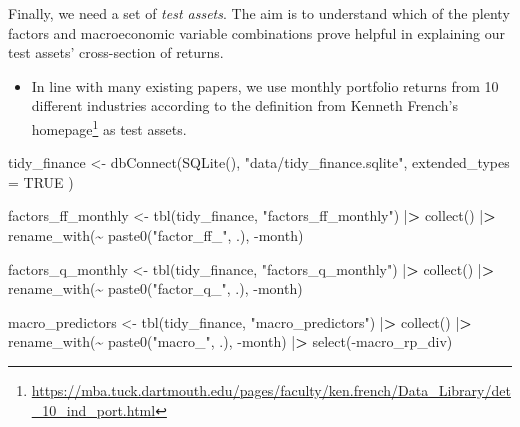 \documentclass[
]{krantz}
\newenvironment{Shaded}{\begin{snugshade}}{\end{snugshade}}
\newcommand{\AttributeTok}[1]{\textcolor[rgb]{0.61,0.61,0.61}{#1}}
\newcommand{\ConstantTok}[1]{\textcolor[rgb]{0,0,0}{#1}}
\newcommand{\ErrorTok}[1]{\textcolor[rgb]{0.14,0.14,0.14}{\textbf{#1}}}
\newcommand{\FunctionTok}[1]{\textcolor[rgb]{0,0,0}{#1}}
\newcommand{\NormalTok}[1]{#1}
\newcommand{\OtherTok}[1]{\textcolor[rgb]{0.37,0.37,0.37}{#1}}
\newcommand{\SpecialCharTok}[1]{\textcolor[rgb]{0,0,0}{#1}}
\newcommand{\StringTok}[1]{\textcolor[rgb]{0.5,0.5,0.5}{#1}}
\providecommand{\tightlist}{%
  \setlength{\itemsep}{0pt}\setlength{\parskip}{0pt}}
\renewcommand{\href}[2]{#2\footnote{\url{#1}}}
\begin{document}
Finally, we need a set of \emph{test assets}. The aim is to understand which of the plenty factors and macroeconomic variable combinations prove helpful in explaining our test assets' cross-section of returns.

\begin{itemize}
\tightlist
\item
  In line with many existing papers, we use monthly portfolio returns from 10 different industries according to the definition from \href{https://mba.tuck.dartmouth.edu/pages/faculty/ken.french/Data_Library/det_10_ind_port.html}{Kenneth French's homepage} as test assets.
\end{itemize}

\begin{Shaded}
\begin{Highlighting}[]
\NormalTok{tidy\_finance }\OtherTok{\textless{}{-}} \FunctionTok{dbConnect}\NormalTok{(}\FunctionTok{SQLite}\NormalTok{(),}
  \StringTok{"data/tidy\_finance.sqlite"}\NormalTok{,}
  \AttributeTok{extended\_types =} \ConstantTok{TRUE}
\NormalTok{)}

\NormalTok{factors\_ff\_monthly }\OtherTok{\textless{}{-}} \FunctionTok{tbl}\NormalTok{(tidy\_finance, }\StringTok{"factors\_ff\_monthly"}\NormalTok{) }\SpecialCharTok{|}\ErrorTok{\textgreater{}}
  \FunctionTok{collect}\NormalTok{() }\SpecialCharTok{|}\ErrorTok{\textgreater{}}
  \FunctionTok{rename\_with}\NormalTok{(}\SpecialCharTok{\textasciitilde{}} \FunctionTok{paste0}\NormalTok{(}\StringTok{"factor\_ff\_"}\NormalTok{, .), }\SpecialCharTok{{-}}\NormalTok{month)}

\NormalTok{factors\_q\_monthly }\OtherTok{\textless{}{-}} \FunctionTok{tbl}\NormalTok{(tidy\_finance, }\StringTok{"factors\_q\_monthly"}\NormalTok{) }\SpecialCharTok{|}\ErrorTok{\textgreater{}}
  \FunctionTok{collect}\NormalTok{() }\SpecialCharTok{|}\ErrorTok{\textgreater{}}
  \FunctionTok{rename\_with}\NormalTok{(}\SpecialCharTok{\textasciitilde{}} \FunctionTok{paste0}\NormalTok{(}\StringTok{"factor\_q\_"}\NormalTok{, .), }\SpecialCharTok{{-}}\NormalTok{month)}

\NormalTok{macro\_predictors }\OtherTok{\textless{}{-}} \FunctionTok{tbl}\NormalTok{(tidy\_finance, }\StringTok{"macro\_predictors"}\NormalTok{) }\SpecialCharTok{|}\ErrorTok{\textgreater{}}
  \FunctionTok{collect}\NormalTok{() }\SpecialCharTok{|}\ErrorTok{\textgreater{}}
  \FunctionTok{rename\_with}\NormalTok{(}\SpecialCharTok{\textasciitilde{}} \FunctionTok{paste0}\NormalTok{(}\StringTok{"macro\_"}\NormalTok{, .), }\SpecialCharTok{{-}}\NormalTok{month) }\SpecialCharTok{|}\ErrorTok{\textgreater{}}
  \FunctionTok{select}\NormalTok{(}\SpecialCharTok{{-}}\NormalTok{macro\_rp\_div)}


\end{Highlighting}
\end{Shaded}
\end{document}
